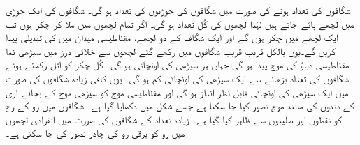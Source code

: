 شگافوں کی تعداد  ہونے کی صورت میں شگافوں کی جوڑیوں کی تعداد  ہو گی۔ شگافوں کی ایک جوڑی میں  لچھے پائے جاتے ہیں لہٰذا لچھوں کی کُل تعداد  ہو گی۔ اگر تمام لچھوں میں ملا کر  چکر ہوں تب ایک لچھے میں   چکر ہوں گے اور ایک شگاف کے دو لچھے،  مقناطیسی میدان میں   کی تبدیلی پیدا کریں گے۔یوں  بالکل قریب قریب شگافوں میں رکھے گئے لچھوں سے خلائی درز میں  سیڑھی نما مقناطیسی دباؤ کی موج پیدا ہو گی جہاں ہر سیڑھی کی اونچائی   ہو گی۔ کُل چکر   کو اٹل رکھتے ہوئے شگافوں کی تعداد بڑھانے سے  ایک سیڑھی کی اونچائی کم ہو گی۔  یوں کافی زیادہ شگافوں کی صورت میں ایک سیڑھی کی اونچائی قابل نظر انداز ہو گی اور مقناطیسی موج  کو سیڑھی موج کے بجائے آری کے دندوں کی مانند موج تصور کیا جا سکتا ہے  جسے شکل   میں دکھایا گیا ہے۔  شگافوں میں رو کے رخ کو نقطوں اور صلیبوں سے ظاہر کیا گیا ہے۔ زیادہ تعداد کے شگافوں کی  صورت میں انفرادی لچھوں میں رو کو برقی رو کی چادر تصور کی جا سکتی ہے۔
